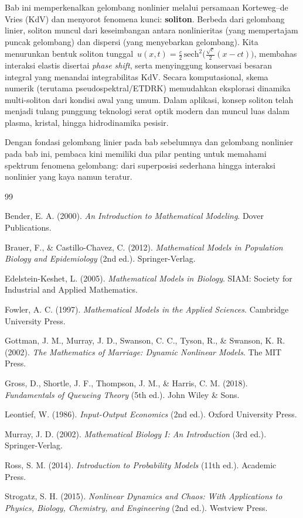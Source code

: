 \documentclass{bukumjh}
\begin{document}
Bab ini memperkenalkan gelombang nonlinier melalui persamaan Korteweg--de Vries (KdV) dan menyorot fenomena kunci: \textbf{soliton}. 
Berbeda dari gelombang linier, soliton muncul dari keseimbangan antara nonlinieritas (yang mempertajam puncak gelombang) dan dispersi (yang menyebarkan gelombang). 
Kita menurunkan bentuk soliton tunggal \,$u(x,t)=\tfrac{c}{2}\,\mathrm{sech}^2\!\big(\tfrac{\sqrt{c}}{2}(x-ct)\big)$, membahas interaksi elastis disertai \emph{phase shift}, serta menyinggung konservasi besaran integral yang menandai integrabilitas KdV. 
Secara komputasional, skema numerik (terutama pseudospektral/ETDRK) memudahkan eksplorasi dinamika multi-soliton dari kondisi awal yang umum. 
Dalam aplikasi, konsep soliton telah menjadi tulang punggung teknologi serat optik modern dan muncul luas dalam plasma, kristal, hingga hidrodinamika pesisir.

Dengan fondasi gelombang linier pada bab sebelumnya dan gelombang nonlinier pada bab ini, pembaca kini memiliki dua pilar penting untuk memahami spektrum fenomena gelombang: dari superposisi sederhana hingga interaksi nonlinier yang kaya namun teratur.

\backmatter

\begin{thebibliography}{99}

Bender, E. A. (2000). \textit{An Introduction to Mathematical Modeling}. Dover Publications.

Brauer, F., \& Castillo-Chavez, C. (2012). \textit{Mathematical Models in Population Biology and Epidemiology} (2nd ed.). Springer-Verlag.

Edelstein-Keshet, L. (2005). \textit{Mathematical Models in Biology}. SIAM: Society for Industrial and Applied Mathematics.

Fowler, A. C. (1997). \textit{Mathematical Models in the Applied Sciences}. Cambridge University Press.

Gottman, J. M., Murray, J. D., Swanson, C. C., Tyson, R., \& Swanson, K. R. (2002). \textit{The Mathematics of Marriage: Dynamic Nonlinear Models}. The MIT Press.

Gross, D., Shortle, J. F., Thompson, J. M., \& Harris, C. M. (2018). \textit{Fundamentals of Queueing Theory} (5th ed.). John Wiley \& Sons.

Leontief, W. (1986). \textit{Input-Output Economics} (2nd ed.). Oxford University Press.

Murray, J. D. (2002). \textit{Mathematical Biology I: An Introduction} (3rd ed.). Springer-Verlag.

Ross, S. M. (2014). \textit{Introduction to Probability Models} (11th ed.). Academic Press.

Strogatz, S. H. (2015). \textit{Nonlinear Dynamics and Chaos: With Applications to Physics, Biology, Chemistry, and Engineering} (2nd ed.). Westview Press.

\end{thebibliography}

\inserttentangpenulis
\end{document}
